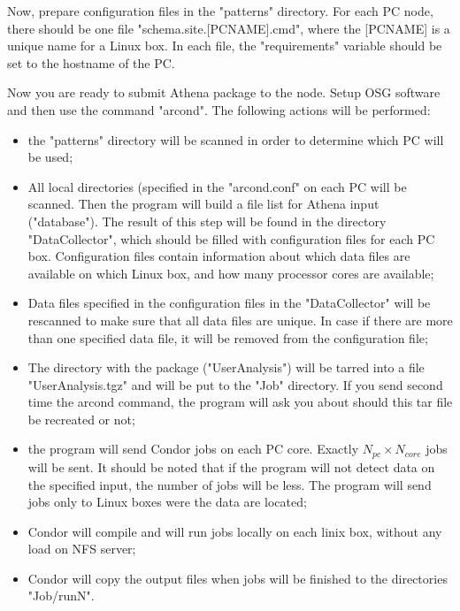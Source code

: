 \documentclass[a4paper]{book}
\begin{document}
Now, prepare configuration files in the "patterns" directory. For each PC node, there should be one
file "schema.site.[PCNAME].cmd", where the [PCNAME] is a unique name for a Linux box.
In each file, the "requirements" variable should be set to the hostname of the PC.

Now you are ready to submit Athena package to the node.
Setup OSG software and then 
use the command "arcond". The following actions will be performed:

\begin{itemize}
\item
the "patterns" directory will be scanned in order to  determine which PC will be used; 

\item
All local directories (specified in the "arcond.conf" 
on each PC will be scanned. Then the program will build a file list for Athena input ("database"). 
The result of this step will be found in the directory "DataCollector", which should be
filled with configuration files for each PC box. Configuration files contain information about which data
files are available on which Linux box, and how many processor cores are available;   

\item
Data files specified in the configuration files in the "DataCollector" will be rescanned to
make sure that all data files are unique. In case if there are more than one
specified data file, it will be removed from the configuration file;  

\item
The directory with the package ("UserAnalysis") will be tarred into a file "UserAnalysis.tgz"
and will be put to the "Job" directory. If you send second time the arcond command,
the program will ask you about should this tar file be recreated or not; 

\item
the program will send Condor jobs on each PC core.
Exactly $N_{pc}\times N_{core}$ jobs will be sent. It should be noted that if the program
will not detect data on the specified input, the number of jobs will be less.
The program will send jobs only to Linux boxes were the data are located; 

\item
Condor will compile and will run jobs locally on each linix box, without any load on NFS server; 

\item
Condor will copy the output files when jobs will be finished to the directories "Job/runN". 

\end{itemize}
\end{document}
